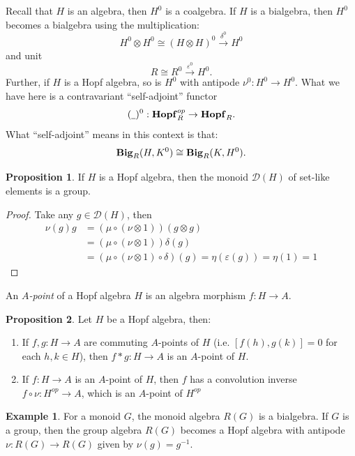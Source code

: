 \documentclass[8pt]{article}
\theoremstyle{definition}
\theoremstyle{definition}
\theoremstyle{definition}
\theoremstyle{definition}
\theoremstyle{definition}
\theoremstyle{definition}
\theoremstyle{definition}
\newtheorem{prop}{Proposition}[section]
\theoremstyle{definition}
\theoremstyle{definition}
\theoremstyle{definition}
\theoremstyle{definition}
\theoremstyle{definition}
\newtheorem{example}{Example}[section]
\theoremstyle{definition}
\theoremstyle{definition}
\theoremstyle{question}
\begin{document}
Recall that $H$ is an algebra, then $H^{0}$ is a coalgebra. If $H$ is a bialgebra, then $H^0$
becomes a bialgebra using the multiplication:
\[
H^0 \otimes H^0 \cong (H \otimes H)^0 \xrightarrow{\delta^0} H^0
\]
and unit
\[
R \cong R^0 \xrightarrow{\varepsilon^0} H^0.
\]
Further, if $H$ is a Hopf algebra, so is $H^0$ with antipode $\nu^0 : H^0 \to H^0$.
What we have here is a contravariant ``self-adjoint'' functor
\[
(\underline{\:\:})^0 : {\bf Hopf}^{op}_R \to {\bf Hopf}_R.
\]
What ``self-adjoint'' means in this context is that:
\[
{\bf Big}_R(H, K^0) \cong {\bf Big}_R(K, H^0).
\]
\begin{prop}
  If $H$ is a Hopf algebra, then the monoid $\mathcal{D}(H)$ of set-like elements is a group.
\end{prop}
\begin{proof}
  Take any $g \in \mathcal{D}(H)$, then
  \begin{align*}
  \nu(g)g &= (\mu \circ (\nu \otimes 1)) (g \otimes g)\\
        &= (\mu \circ (\nu \otimes 1)) \delta(g) \\
        &= (\mu \circ (\nu \otimes 1) \circ \delta) (g) = \eta(\varepsilon(g)) = \eta(1) = 1
  \end{align*}
\end{proof}

An \emph{$A$-point} of a Hopf algebra $H$ is an algebra morphism $f : H \to A$.

\begin{prop} Let $H$ be a Hopf algebra, then:
  \begin{enumerate}
    \item If $f, g : H \to A$ are commuting $A$-points of $H$ (i.e. $[f(h), g(k)] = 0$ for each $h,k \in H$),
    then $f * g : H \to A$ is an $A$-point of $H$.
    \item If $f : H \to A$ is an $A$-point of $H$, then $f$ has a convolution inverse $f \circ \nu : H^{op} \to A$,
    which is an $A$-point of $H^{op}$
  \end{enumerate}
\end{prop}

\begin{example} For a monoid $G$, the monoid algebra $R(G)$ is a bialgebra. If $G$ is a group, then the group algebra $R(G)$ becomes a
  Hopf algebra with antipode $\nu : R(G) \to R(G)$ given by $\nu(g) = g^{-1}$.
\end{example}
\end{document}
